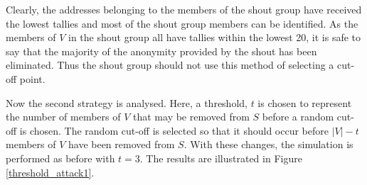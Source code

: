 \documentclass[ %
                    author={Luke Murray},
                supervisor={Dr. Simon Hollis},
                     title={Shadow Peer-to-Peer Networks},
                  subtitle={},
                    degree={MEng},
                      year={2013} ]{thesis}
\begin{document}
Clearly, the addresses belonging to the members of the shout group have received the lowest tallies and most of the shout group members can be identified. As the members of $V$ in the shout group all have tallies within the lowest 20, it is safe to say that the majority of the anonymity provided by the shout has been eliminated. Thus the shout group should not use this method of selecting a cut-off point.

Now the second strategy is analysed. Here, a threshold, $t$ is chosen to represent the number of members of $V$ that may be removed from $S$ before a random cut-off is chosen. The random cut-off is selected so that it should occur before $|V| - t$ members of $V$ have been removed from $S$. With these changes, the simulation is performed as before with $t = 3$. The results are illustrated in Figure \ref{threshold_attack1}.
\end{document}
